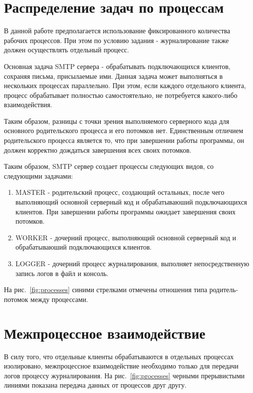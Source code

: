 \documentclass[a4paper,12pt]{report}
\begin{document}
\section{Распределение задач по процессам}

В данной работе предполагается использование фиксированного количества рабочих процессов. При этом по условию задания - журналирование также должен осуществлять отдельный процесс. 

Основная задача SMTP сервера - обрабатывать подключающихся клиентов, сохраняя письма, присылаемые ими. Данная задача может выполняться в нескольких процессах параллельно. При этом, если каждого отдельного клиента, процесс обрабатывает полностью самостоятельно, не потребуется какого-либо взаимодействия. 

Таким образом, разницы с точки зрения выполняемого серверного кода для основного родительского процесса и его потомков нет. Единственным отличием родительского процесса является то, что при завершении работы программы, он должен корректно дождаться завершения всех своих потомков. 

Таким образом, SMTP сервер создает процессы следующих видов, со следующими задачами:
\begin{enumerate}
	\item MASTER - родительский процесс, создающий остальных, после чего выполняющий основной серверный код и обрабатываюший подключающихся клиентов. При завершении работы программы ожидает завершения своих потомков. 
	\item WORKER - дочерний процесс, выполняющий основной серверный код и обрабатываюший подключающихся клиентов.  
	\item LOGGER - дочерний процесс журналирования, выполняет непосредственную запись логов в файл и консоль. 
\end{enumerate}

На рис.~\ref{fig:processes} синими стрелками отмечены отношения типа родитель-потомок между процессами. 

\section{Межпроцессное взаимодействие}

В силу того, что отдельные клиенты обрабатываются в отдельных процессах изолировано, межпроцессное взаимодействие необходимо только для передачи логов процессу журналирования. 
На рис.~\ref{fig:processes} черными прерывистыми линиями показана передача данных от процессов друг другу. 
\end{document}
